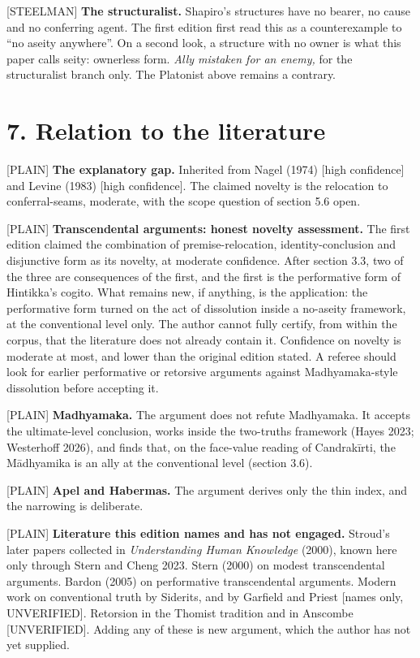 \documentclass[11pt]{article}
\newcommand{\register}[1]{{\ttfamily\small #1}}
\begin{document}
\register{[STEELMAN]} \textbf{The structuralist.} Shapiro's structures have no bearer, no cause and no conferring agent. The first edition first read this as a counterexample to ``no aseity anywhere''. On a second look, a structure with no owner is what this paper calls seity: ownerless form. \emph{Ally mistaken for an enemy,} for the structuralist branch only. The Platonist above remains a contrary.

\section*{7. Relation to the literature}

\register{[PLAIN]} \textbf{The explanatory gap.} Inherited from Nagel (1974) [high confidence] and Levine (1983) [high confidence]. The claimed novelty is the relocation to conferral-seams, moderate, with the scope question of section 5.6 open.

\register{[PLAIN]} \textbf{Transcendental arguments: honest novelty assessment.} The first edition claimed the combination of premise-relocation, identity-conclusion and disjunctive form as its novelty, at moderate confidence. After section 3.3, two of the three are consequences of the first, and the first is the performative form of Hintikka's cogito. What remains new, if anything, is the application: the performative form turned on the act of dissolution inside a no-aseity framework, at the conventional level only. The author cannot fully certify, from within the corpus, that the literature does not already contain it. Confidence on novelty is moderate at most, and lower than the original edition stated. A referee should look for earlier performative or retorsive arguments against Madhyamaka-style dissolution before accepting it.

\register{[PLAIN]} \textbf{Madhyamaka.} The argument does not refute Madhyamaka. It accepts the ultimate-level conclusion, works inside the two-truths framework (Hayes 2023; Westerhoff 2026), and finds that, on the face-value reading of Candrakīrti, the Mādhyamika is an ally at the conventional level (section 3.6).

\register{[PLAIN]} \textbf{Apel and Habermas.} The argument derives only the thin index, and the narrowing is deliberate.

\register{[PLAIN]} \textbf{Literature this edition names and has not engaged.} Stroud's later papers collected in \emph{Understanding Human Knowledge} (2000), known here only through Stern and Cheng 2023. Stern (2000) on modest transcendental arguments. Bardon (2005) on performative transcendental arguments. Modern work on conventional truth by Siderits, and by Garfield and Priest [names only, UNVERIFIED]. Retorsion in the Thomist tradition and in Anscombe [UNVERIFIED]. Adding any of these is new argument, which the author has not yet supplied.
\end{document}

